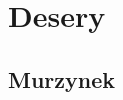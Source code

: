 \documentclass{article}
\begin{document}
%

    \section{Desery}
    \medskip
    \subsection{Murzynek}
    \bigskip
\end{document}
